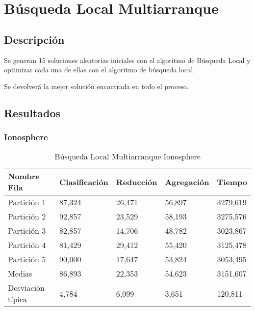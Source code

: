 
\section{Búsqueda Local Multiarranque}  

\subsection{Descripción }

Se generan 15 soluciones aleatorias
iniciales con el algoritmo de Búsqueda Local y optimizar cada una de ellas con el algoritmo
de búsqueda local. 

Se devolverá la mejor solución encontrada en todo
el proceso. 

\subsection{Resultados}
\subsubsection{Ionosphere}
\begin{table}[!ht]
    \centering
    \caption{Búsqueda Local Multiarranque Ionosphere}
    \begin{tabular}{|l|l|l|l|l|}
    \hline
        Nombre Fila & Clasificación & Reducción & Agregación & Tiempo \\ \hline
        Partición 1 & 87,324 & 26,471 & 56,897 & 3279,619 \\ \hline
        Partición 2 & 92,857 & 23,529 & 58,193 & 3275,576 \\ \hline
        Partición 3 & 82,857 & 14,706 & 48,782 & 3023,867 \\ \hline
        Partición 4 & 81,429 & 29,412 & 55,420 & 3125,478 \\ \hline
        Partición 5 & 90,000 & 17,647 & 53,824 & 3053,495 \\ \hline
        Medias  & 86,893 & 22,353 & 54,623 & 3151,607 \\ \hline
        Desviación típica & 4,784 & 6,099 & 3,651 & 120,811 \\ \hline
    \end{tabular}
    \label{BLB-Ionosphere}
\end{table}
